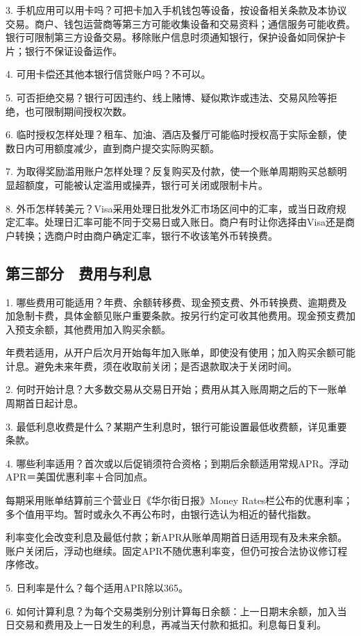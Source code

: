 \documentclass[UTF8,fontset=none,11pt,a4paper]{ctexart}
\begin{document}
3. 手机应用可以用卡吗？可把卡加入手机钱包等设备，按设备相关条款及本协议交易。商户、钱包运营商等第三方可能收集设备和交易资料；通信服务可能收费。银行可限制第三方设备交易。移除账户信息时须通知银行，保护设备如同保护卡片；银行不保证设备运作。


4. 可用卡偿还其他本银行信贷账户吗？不可以。


5. 可否拒绝交易？银行可因违约、线上赌博、疑似欺诈或违法、交易风险等拒绝，也可限制期间授权次数。


6. 临时授权怎样处理？租车、加油、酒店及餐厅可能临时授权高于实际金额，使数日内可用额度减少，直到商户提交实际购买额。


7. 为取得奖励滥用账户怎样处理？反复购买及付款，使一个账单周期购买总额明显超额度，可能被认定滥用或操弄，银行可关闭或限制卡片。


8. 外币怎样转美元？Visa采用处理日批发外汇市场区间中的汇率，或当日政府规定汇率。处理日汇率可能不同于交易日或入账日。商户有时让你选择由Visa还是商户转换；选商户时由商户确定汇率，银行不收该笔外币转换费。


\subsection*{第三部分　费用与利息}
1. 哪些费用可能适用？年费、余额转移费、现金预支费、外币转换费、逾期费及加急制卡费，具体金额见账户重要条款。按另行约定可收其他费用。现金预支费加入预支余额，其他费用加入购买余额。


年费若适用，从开户后次月开始每年加入账单，即使没有使用；加入购买余额可能计息。避免未来年费，须在收取前关闭；是否退款取决于关闭时间。


2. 何时开始计息？大多数交易从交易日开始；费用从其入账周期之后的下一账单周期首日起计息。


3. 最低利息收费是什么？某期产生利息时，银行可能设置最低收费额，详见重要条款。


4. 哪些利率适用？首次或以后促销须符合资格；到期后余额适用常规APR。浮动APR＝美国优惠利率＋合同加点。


每期采用账单结算前三个营业日《华尔街日报》Money Rates栏公布的优惠利率；多个值用平均。暂时或永久不再公布时，由银行选认为相近的替代指数。


利率变化会改变利息及最低付款；新APR从账单周期首日适用现有及未来余额。账户关闭后，浮动也继续。固定APR不随优惠利率变，但仍可按合法协议修订程序修改。


5. 日利率是什么？每个适用APR除以365。


6. 如何计算利息？为每个交易类别分别计算每日余额：上一日期末余额，加入当日交易和费用及上一日发生的利息，再减当天付款和抵扣。利息每日复利。
\end{document}
